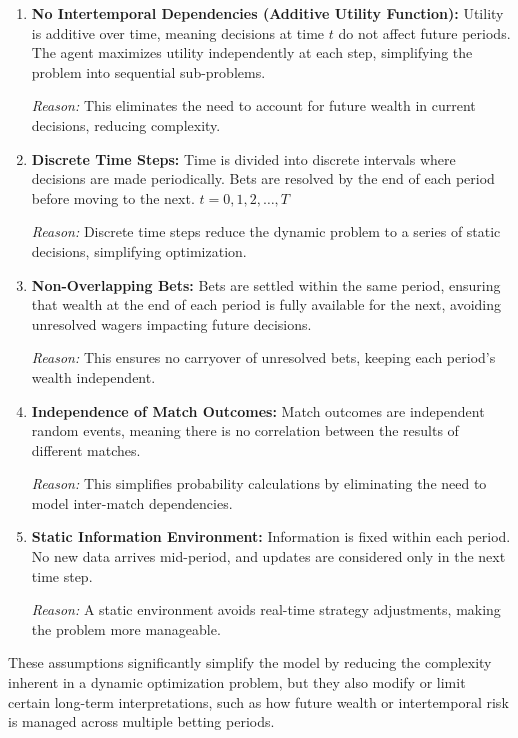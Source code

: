 \begin{enumerate}
    \item \textbf{No Intertemporal Dependencies (Additive Utility Function):} 
    Utility is additive over time, meaning decisions at time \( t \) do not affect future periods. The agent maximizes utility independently at each step, simplifying the problem into sequential sub-problems.
    
    \textit{Reason:} This eliminates the need to account for future wealth in current decisions, reducing complexity.

    \item \textbf{Discrete Time Steps:} 
    Time is divided into discrete intervals where decisions are made periodically. Bets are resolved by the end of each period before moving to the next. \( t = 0, 1, 2, \dots, T \)
    
    \textit{Reason:} Discrete time steps reduce the dynamic problem to a series of static decisions, simplifying optimization.

    \item \textbf{Non-Overlapping Bets:} 
    Bets are settled within the same period, ensuring that wealth at the end of each period is fully available for the next, avoiding unresolved wagers impacting future decisions.
    
    \textit{Reason:} This ensures no carryover of unresolved bets, keeping each period's wealth independent.

    \item \textbf{Independence of Match Outcomes:} 
    Match outcomes are independent random events, meaning there is no correlation between the results of different matches.
    
    \textit{Reason:} This simplifies probability calculations by eliminating the need to model inter-match dependencies.

    \item \textbf{Static Information Environment:} 
    Information is fixed within each period. No new data arrives mid-period, and updates are considered only in the next time step.
    
    \textit{Reason:} A static environment avoids real-time strategy adjustments, making the problem more manageable.
\end{enumerate}

These assumptions significantly simplify the model by reducing the complexity inherent in a dynamic optimization problem, but they also modify or limit certain long-term interpretations, such as how future wealth or intertemporal risk is managed across multiple betting periods.


